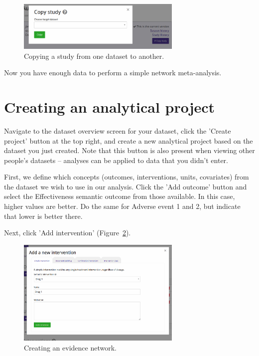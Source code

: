 \documentclass[12pt]{article}
\begin{document}
\begin{figure}[!ht]
  \centering
  \includegraphics[width=0.7\textwidth]{img/copyStudy.png}
  \caption{Copying a study from one dataset to another.}
\label{fig:copyStudy}
\end{figure}

Now you have enough data to perform a simple network meta-analysis.

\section{Creating an analytical project}

Navigate to the dataset overview screen for your dataset, click the 'Create project' button at the top right, and create a new analytical project based on the dataset you just created.
Note that this button is also present when viewing other people's datasets -- analyses can be applied to data that you didn't enter.

First, we define which concepts (outcomes, interventions, units, covariates) from the dataset we wish to use in our analysis.
Click the 'Add outcome' button and select the Effectiveness semantic outcome from those available.
In this case, higher values are better.
Do the same for Adverse event 1 and 2, but indicate that lower is better there.

Next, click 'Add intervention' (Figure~\ref{fig:addIntervention}).

\begin{figure}[!ht]
  \centering
  \includegraphics[width=0.7\textwidth]{img/addIntervention.png}
  \caption{Creating an evidence network.}
\label{fig:addIntervention}
\end{figure}
\end{document}
